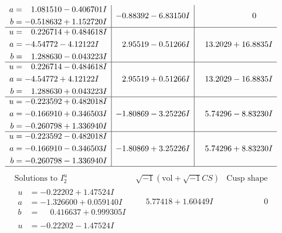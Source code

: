 \documentclass[1p]{elsarticle_modified}
\theoremstyle{definition}
\newcommand{\I}{\sqrt{-1}}
\begin{document}
$$\begin{array}{c|c|c}
\begin{aligned}
a &= \phantom{-}1.081510 - 0.406701 I \\
b &= -0.518632 + 1.152720 I\end{aligned}
 & -0.88392 - 6.83150 I & \phantom{-0.000000 } 0 \\ \hline\begin{aligned}
u &= \phantom{-}0.226714 + 0.484618 I \\
a &= -4.54772 - 4.12122 I \\
b &= \phantom{-}1.288630 - 0.043223 I\end{aligned}
 & \phantom{-}2.95519 - 0.51266 I & \phantom{-}13.2029 + 16.8835 I \\ \hline\begin{aligned}
u &= \phantom{-}0.226714 - 0.484618 I \\
a &= -4.54772 + 4.12122 I \\
b &= \phantom{-}1.288630 + 0.043223 I\end{aligned}
 & \phantom{-}2.95519 + 0.51266 I & \phantom{-}13.2029 - 16.8835 I \\ \hline\begin{aligned}
u &= -0.223592 + 0.482018 I \\
a &= -0.166910 + 0.346503 I \\
b &= -0.260798 + 1.336940 I\end{aligned}
 & -1.80869 - 3.25226 I & \phantom{-}5.74296 - 8.83230 I \\ \hline\begin{aligned}
u &= -0.223592 - 0.482018 I \\
a &= -0.166910 - 0.346503 I \\
b &= -0.260798 - 1.336940 I\end{aligned}
 & -1.80869 + 3.25226 I & \phantom{-}5.74296 + 8.83230 I\\
 \hline 
 \end{array}$$\newpage$$\begin{array}{c|c|c}  
\text{Solutions to }I^u_{2}& \I (\text{vol} + \sqrt{-1}CS) & \text{Cusp shape}\\
 \hline 
\begin{aligned}
u &= -0.22202 + 1.47524 I \\
a &= -1.326600 + 0.059140 I \\
b &= \phantom{-}0.416637 + 0.999305 I\end{aligned}
 & \phantom{-}5.77418 + 1.60449 I & \phantom{-0.000000 } 0 \\ \hline\begin{aligned}
u &= -0.22202 - 1.47524 I \\

\end{aligned}
\end{array}$$
\end{document}
